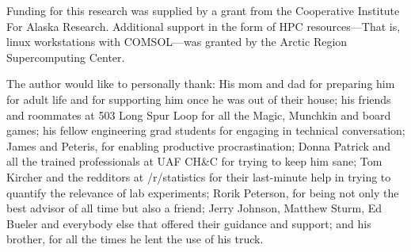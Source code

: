 Funding for this research was supplied by a grant from the Cooperative Institute
For Alaska Research. Additional support in the form of HPC resources---That is, 
linux workstations with COMSOL---was granted by the Arctic Region Supercomputing
Center.

The author would like to personally thank: His mom and dad for preparing him for
adult life and for supporting him once he was out of their house;
his friends and roommates at 503 Long Spur Loop for all the Magic, Munchkin and
board games;
his fellow engineering grad students for engaging in technical conversation;
James and Peteris, for enabling productive procrastination;
Donna Patrick and all the trained professionals at UAF CH\&C for trying to keep him sane;
Tom Kircher and the redditors at /r/statistics for their last-minute help in trying to quantify the relevance of lab experiments;
Rorik Peterson, for being not only the best advisor of all time but also a friend;
Jerry Johnson, Matthew Sturm, Ed Bueler and everybody else that offered their guidance and support; 
and his brother, for all the times he lent the use of his truck.
